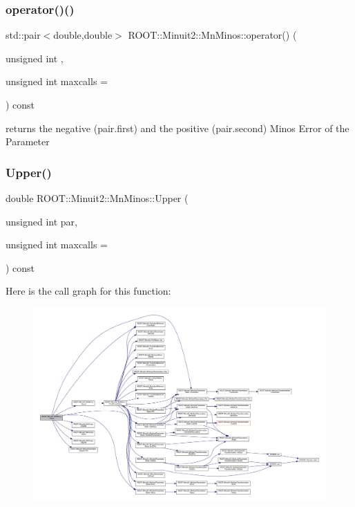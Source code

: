 \subsubsection{\texorpdfstring{operator()()}{operator()()}\hspace{0.1cm}{\footnotesize\ttfamily [3/3]}}
{\footnotesize\ttfamily std\+::pair$<$double,double$>$ R\+O\+O\+T\+::\+Minuit2\+::\+Mn\+Minos\+::operator() (\begin{DoxyParamCaption}\item[{unsigned int}]{,  }\item[{unsigned int}]{maxcalls = {} }\end{DoxyParamCaption}) const}

returns the negative (pair.\+first) and the positive (pair.\+second) Minos Error of the Parameter \mbox{\label{classROOT_1_1Minuit2_1_1MnMinos_a387b76e3135998c519db7e6ae4cc3d90}} 
\subsubsection{\texorpdfstring{Upper()}{Upper()}\hspace{0.1cm}{\footnotesize\ttfamily [1/3]}}
{\footnotesize\ttfamily double R\+O\+O\+T\+::\+Minuit2\+::\+Mn\+Minos\+::\+Upper (\begin{DoxyParamCaption}\item[{unsigned int}]{par,  }\item[{unsigned int}]{maxcalls = {} }\end{DoxyParamCaption}) const}

Here is the call graph for this function\+:
\nopagebreak
\begin{figure}[H]
\begin{center}
\leavevmode
\includegraphics[width=350pt]{dc/d91/classROOT_1_1Minuit2_1_1MnMinos_a387b76e3135998c519db7e6ae4cc3d90_cgraph}
\end{center}
\end{figure}
\mbox{\label{classROOT_1_1Minuit2_1_1MnMinos_a387b76e3135998c519db7e6ae4cc3d90}} 
